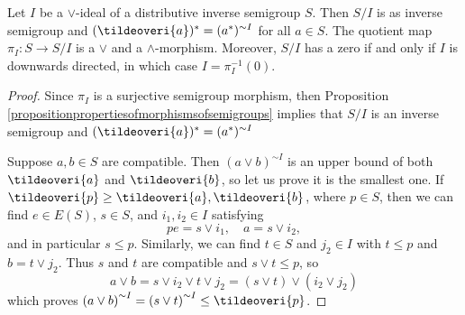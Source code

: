 \begin{theorem}\label{theoremquotientmapofsemigroupisverygood}
Let $I$ be a $\lor$-ideal of a distributive inverse semigroup $S$. Then $S/I$ is as inverse semigroup and $(\tildeoveri{a})^*=(a^*)^{\sim I}$ for all $a\in S$. The quotient map $\pi_I:S\to S/I$ is a $\lor$ and a $\land$-morphism. Moreover, $S/I$ has a zero if and only if $I$ is downwards directed, in which case $I=\pi_I^{-1}(0)$.
\end{theorem}
\begin{proof}
Since $\pi_I$ is a surjective semigroup morphism, then Proposition \ref{propositionpropertiesofmorphismsofsemigroups} implies that $S/I$ is an inverse semigroup and $(\tildeoveri{a})^*=(a^*)^{\sim I}$


%

Suppose $a,b\in S$ are compatible. Then $\left(a\lor b\right)^{\sim I}$ is an upper bound of both $\tildeoveri{a}$ and $\tildeoveri{b}$, so let us prove it is the smallest one. If $\tildeoveri{p}\geq\tildeoveri{a},\tildeoveri{b}$, where $p\in S$, then we can find $e\in E(S)$, $s\in S$, and $i_1,i_2\in I$ satisfying
\[pe=s\lor i_1,\quad a=s\lor i_2,\]
and in particular $s\leq p$. Similarly, we can find $t\in S$ and $j_2\in I$ with $t\leq p$ and $b=t\lor j_2$. Thus $s$ and $t$ are compatible and $s\lor t\leq p$, so
\[a\lor b=s\lor i_2\lor t\lor j_2=(s\lor t)\lor(i_2\lor j_2)\]
which proves $\left(a\lor b\right)^{\sim I}=\left(s\lor t\right)^{\sim I}\leq \tildeoveri{p}$.


\end{proof}
